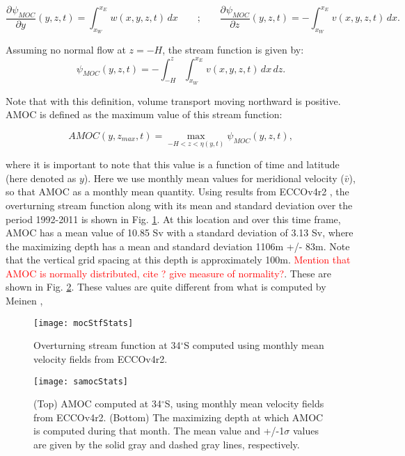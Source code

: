 \documentclass[a4paper,11pt]{article}
\newcommand{\pderiv}[3][]{%
  \ensuremath{\frac{\partial^{#1} {#2}}{\partial {#3}^{#1}}}}
\newcommand{\red}[1]{\textcolor{red}{#1}}
\newcommand{\degSym}{$^{\circ}$}
\begin{document}
    \begin{equation}
      \pderiv[]{\psi_{MOC}}{y}(y,z,t) = \int_{x_W}^{x_E}w(x,y,z,t)\,dx \qquad\text{;}\qquad \pderiv[]{\psi_{MOC}}{z}(y,z,t) = -\int_{x_W}^{x_E}v(x,y,z,t)\,dx .
     \label{eq:mocStf}
    \end{equation}

   Assuming no normal flow at $z = -H$, the stream function is given by:
   \begin{equation}
    \psi_{MOC}(y,z,t) = -\int_{-H}^{z}\int_{x_W}^{x_E}v(x,y,z,t)\,dx\,dz .
    \label{eq:mocStf2}
   \end{equation}

   Note that with this definition, volume transport moving northward is positive. AMOC is defined as the maximum value of this stream function: 
   
   \begin{equation}
    AMOC(y,z_{max},t) = \max_{-H < z < \eta(y,t)}{\psi_{MOC}(y,z,t)} ,
    \label{eq:amoc}
   \end{equation}

   where it is important to note that this value is a function of time and latitude (here denoted as $y$). Here we use monthly mean values for meridional velocity ($\bar{v}$), so that AMOC as a monthly mean quantity. Using results from ECCOv4r2 \cite{forgetEccov4}, the overturning stream function along with its mean and standard deviation over the period 1992-2011 is shown in Fig. \ref{fig:mocStfStats}. At this location and over this time frame, AMOC has a mean value of 10.85 Sv with a standard deviation of 3.13 Sv, where the maximizing depth has a mean and standard deviation 1106m +/- 83m. Note that the vertical grid spacing at this depth is approximately 100m. \red{Mention that AMOC is normally distributed, cite \cite{wunschAndHeimbach_AMOC}? give measure of normality?}. These are shown in Fig. \ref{fig:samocStats}. These values are quite different from what is computed by Meinen  \cite{meinenSamoc}, 
   
   \begin{figure}
    \centering
    \texttt{[image: mocStfStats]}
    \caption{Overturning stream function at 34\degSym S computed using monthly mean velocity fields from ECCOv4r2.}
    \label{fig:mocStfStats}
   \end{figure}
   
   \begin{figure}
    \centering
    \texttt{[image: samocStats]}
    \caption{(Top) AMOC computed at 34\degSym S, using monthly mean velocity fields from ECCOv4r2. (Bottom) The maximizing depth at which AMOC is computed during that month. The mean value and +/-1$\sigma$ values are given by the solid gray and dashed gray lines, respectively.}
    \label{fig:samocStats}
   \end{figure}
\end{document}
